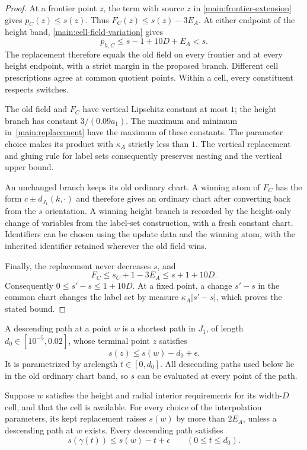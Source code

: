 \begin{proof}
At a frontier point $z$, the term with source $z$ in
\eqref{main:frontier-extension} gives $p_C(z)\le s(z)$.  Thus
$F_C(z)\le s(z)-3E_A$.  At either endpoint of the height band,
\eqref{main:cell-field-variation} gives
\[
 p_{h,C}\le s-1+10D+E_A<s.
\]
The replacement therefore equals the old field on every frontier
and at every height endpoint, with a strict margin in the proposed
branch.  Different cell prescriptions agree at common quotient
points.  Within a cell, every constituent respects switches.

The old field and $F_C$ have vertical Lipschitz constant at most $1$;
the height branch has constant $3/(0.09a_1)$.  The maximum and minimum
in~\eqref{main:replacement} have the maximum of these constants.
The parameter choice makes its product with $\kappa_A$ strictly
less than $1$.  The vertical replacement and gluing rule for label
sets consequently preserves nesting and the vertical upper bound.

An unchanged branch keeps its old ordinary chart.  A winning atom
of $F_C$ has the form $c\pm d_{J_1}(k,\cdot)$ and therefore gives
an ordinary chart after converting back from the $s$ orientation.
A winning height branch is recorded by the height-only change of
variables from the label-set construction, with a fresh constant
chart.  Identifiers can be chosen using the update data and the
winning atom, with the inherited identifier retained wherever the
old field wins.

Finally, the replacement never decreases $s$, and
\[
 F_C\le s_C+1-3E_A\le s+1+10D.
\]
Consequently $0\le s'-s\le1+10D$.  At a fixed point, a change
$s'-s$ in the common chart changes the label set by measure
$\kappa_A|s'-s|$, which proves the stated bound.
\end{proof}

\begin{definition}
\label{main:ray-definition}
A descending path at a point $w$ is a shortest path in $J_1$, of
length $d_0\in[10^{-5},0.02]$, whose terminal point $z$ satisfies
\begin{equation}
 s(z)\le s(w)-d_0+\epsilon.
 \label{main:ray-endpoint}
\end{equation}
It is parametrized by arclength $t\in[0,d_0]$.  All descending paths
used below lie in the old ordinary chart band, so $s$ can be
evaluated at every point of the path.
\end{definition}

\begin{lemma}
\label{main:ray}
Suppose $w$ satisfies the height and radial interior requirements
for its width-$D$ cell, and that the cell is available.  For every
choice of the interpolation parameters, its kept replacement
raises $s(w)$ by more than $2E_A$, unless a descending path at $w$
exists.  Every descending path satisfies
\begin{equation}
 s(\gamma(t))\le s(w)-t+\epsilon
 \qquad(0\le t\le d_0).
 \label{main:ray-prefix}
\end{equation}
\end{lemma}

